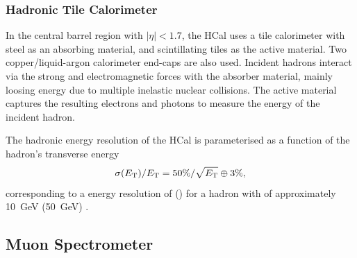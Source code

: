 
\subsubsection{Hadronic Tile Calorimeter}
In the central barrel region with $|\eta| < 1.7$, the HCal uses a tile calorimeter with steel as an absorbing material, and scintillating tiles as the active material.
Two copper/liquid-argon calorimeter end-caps are also used.
Incident hadrons interact via the strong and electromagnetic forces with the absorber material, mainly loosing energy due to multiple inelastic nuclear collisions.
The active material captures the resulting electrons and photons to measure the energy of the incident hadron.

The hadronic energy resolution of the HCal is parameterised as a function of the hadron's transverse energy
%
\begin{equation}
  \sigma(E_{\text{T}}) / E_{\text{T}} = 50\% / \sqrt{E_{\text{T}}} \oplus 3\% ,
\end{equation}
%
corresponding to a energy resolution of  () for a hadron with \ET of approximately \SI{10}{\GeV} (\SI{50}{\GeV}) \cite{ATLAS-TDR-03}.





\subsection{Muon Spectrometer}\label{sec:muon_spectrometer}

